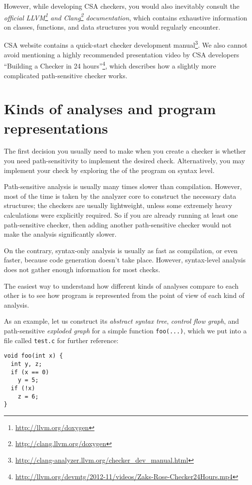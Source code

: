 \documentclass[a4paper,12pt]{article}
\newenvironment{nobr}{\begin{minipage}{\textwidth}\setlength\parskip{1em}
}{\end{minipage}\ignorespacesafterend}
\begin{document}
However, while developing CSA checkers, you would also inevitably consult the \emph{official LLVM\footnote{\url{http://llvm.org/doxygen}} and Clang\footnote{\url{http://clang.llvm.org/doxygen}} documentation}, which contains exhaustive information on classes, functions, and data structures you would regularly encounter.

CSA website contains a quick-start checker development manual\footnote{\url{http://clang-analyzer.llvm.org/checker_dev_manual.html}}. We also cannot avoid mentioning a highly recommended presentation video by CSA developers ``Building a Checker in 24 hours''\footnote{\url{http://llvm.org/devmtg/2012-11/videos/Zaks-Rose-Checker24Hours.mp4}}, which describes how a slightly more complicated path-sensitive checker works.

\newpage
\section{Kinds of analyses and program representations}\label{sec:data_structures}

The first decision you usually need to make when you create a checker is whether you need path-sensitivity to implement the desired check. Alternatively, you may implement your check by exploring the of the program on syntax level.

Path-sensitive analysis is usually many times slower than compilation. However, most of the time is taken by the analyzer core to construct the necessary data structures; the checkers are usually lightweight, unless some extremely heavy calculations were explicitly required. So if you are already running at least one path-sensitive checker, then adding another path-sensitive checker would not make the analysis significantly slower.

On the contrary, syntax-only analysis is usually as fast as compilation, or even faster, because code generation doesn't take place. However, syntax-level analysis does not gather enough information for most checks.

The easiest way to understand how different kinds of analyses compare to each other is to see how program is represented from the point of view of each kind of analysis.

\begin{nobr}
As an example, let us construct its \emph{abstract syntax tree}, \emph{control flow graph}, and path-sensitive \emph{exploded graph} for a simple function \lstinline|foo(...)|, which we put into a file called \lstinline|test.c| for further reference:

\begin{lstlisting}[style=cplusplus,title=\lstinline|test.c|]
void foo(int x) {
  int y, z;
  if (x == 0)
    y = 5;
  if (!x)
    z = 6;
}
\end{lstlisting}
\end{nobr}
\end{document}
